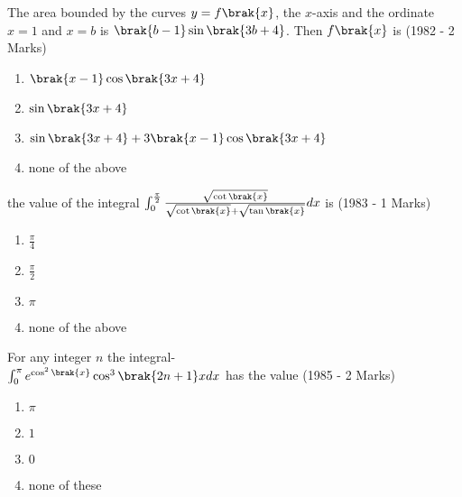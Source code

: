	\item The area bounded by the curves $y=f\brak{x}$, the $x$-axis and the ordinate $x=1$ and $x=b$ is $\brak{b-1} \sin \brak{3b+4}$. Then $f\brak{x}$ is
		\hfill{(1982 - 2 Marks)}
	                \begin{enumerate}
			\item$\brak{x-1} \cos \brak{3x+4}$
			\item$\sin {\brak{3x+4}}$
			\item$\sin {\brak{3x+4}+3\brak{x-1} \cos {\brak{3x+4}}}$
			\item none of the above
		        \end{enumerate}
			\item the value of the integral $\int_0^{\frac{\pi}{2}} \frac{\sqrt{\cot\brak{x}}}{\sqrt{\cot\brak{x}}+\sqrt{\tan\brak{x}}}dx$ is 
\hfill{(1983 - 1 Marks)}
	                \begin{enumerate}
			\item $\frac{\pi}{4}$
		\item$\frac{\pi}{2}$
			\item$\pi$
		\item none of the above
		         \end{enumerate}
			\item For any integer $n$ the integral-\\
		$\int_0^{\pi} e^{\cos^2 \brak{x}} \cos ^3 {\brak{2n+1}}xdx$ has the value
                     	\hfill{(1985 - 2 Marks)}   
			\begin{enumerate}
			\item	$\pi$
			\item $1$
			\item $0$
			\item none of these
		        \end{enumerate}
	

